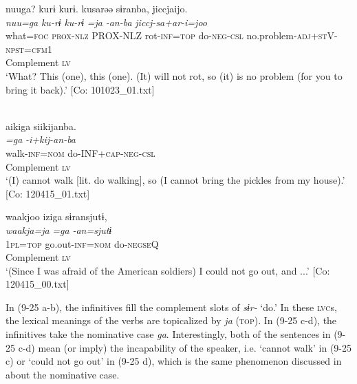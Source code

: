 \ex \label{ex:9.25b} %
    \gllll  nuuga?  kurɨ  kurɨ.  kusarəə  sɨranba,   jiccjaijo.\\
      \textit{nuu=ga}  \textit{ku-rɨ}  \textit{ku-rɨ}  \textit{=ja}  \textit{-an-ba}   \textit{jiccj-sa+ar-i=joo}\\
      what=\textsc{foc}  \textsc{prox}-\textsc{nlz}  PROX-NLZ  rot-\textsc{inf}=\textsc{top}  do-\textsc{neg}-\textsc{csl}   no.problem-\textsc{adj}+\textsc{st}V-\textsc{npst}=\textsc{cfm}1\\
            Complement  \textsc{lv}\\
    \glt       ‘What? This (one), this (one). (It) will not rot, so (it) is no problem (for you to bring it back).’ [Co: 101023\_01.txt]

\ex\label{ex:9.25c}\relax [= (6-49)]\\
    \gllll  aikiga  siikijanba.\\
      \textit{=ga}  \textit{-i+kij-an-ba}\\
      walk-\textsc{inf}=\textsc{nom}  do-INF+\textsc{cap}-\textsc{neg}-\textsc{csl}\\
      Complement  \textsc{lv}\\
    \glt       ‘(I) cannot walk [lit. do walking], so (I cannot bring the pickles from my house).’ [Co: 120415\_01.txt]

\ex \label{ex:9.25d} %
    \gllll  waakjoo  iziga  sɨransjutɨ,\\
      \textit{waakja=ja}  \textit{=ga}  \textit{-an=sjutɨ}\\
      1\textsc{pl}=\textsc{top}  go.out-\textsc{inf}=\textsc{nom}  do-\textsc{negseQ}\\
        Complement  \textsc{lv}\\
    \glt       ‘(Since I was afraid of the American soldiers) I could not go out, and ...’ [Co: 120415\_00.txt]
    \z
\z

In (9-25 a-b), the infinitives fill the complement slots of \textit{sɨr-} ‘do.’ In these \textsc{lvc}s, the lexical meanings of the verbs are topicalized by \textit{ja} (\textsc{top}). In (9-25 c-d), the infinitives take the nominative case \textit{ga}. Interestingly, both of the sentences in (9-25 c-d) mean (or imply) the incapability of the speaker, i.e. ‘cannot walk’ in (9-25 c) or ‘could not go out’ in (9-25 d), which is the same phenomenon discussed in  about the nominative case.

